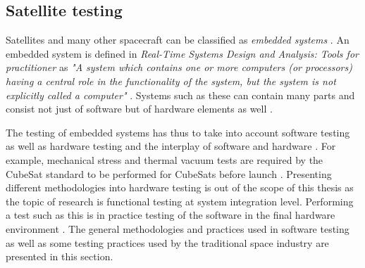 \documentclass[english,12pt,a4paper,pdftex,elec,utf8]{aaltothesis}
\begin{document}
\subsection{Satellite testing}
Satellites and many other spacecraft can be classified as \textit{embedded systems} \cite{embeddedjokusatellite}. An embedded system is defined in \textit{Real-Time Systems Design and Analysis: Tools for practitioner} as \textit{"A system which contains one or more computers (or processors) having a central role in the functionality of the system, but the system is not explicitly called a computer"} \cite{sularikurssi}. Systems such as these can contain  many parts and consist not just of software but of hardware elements as well \cite{embeddedsofteng}.\par
The testing of embedded systems has thus to take into account software testing as well as hardware testing and the interplay of software and hardware \cite{embeddedsofteng}. For example, mechanical stress and thermal vacuum tests are required by the CubeSat standard to be performed for CubeSats before launch \cite{cds}. Presenting different methodologies into hardware testing is out of the scope of this thesis as the topic of research is functional testing at system integration level. Performing a test such as this is in practice testing of the software in the final hardware environment \cite{embeddedsofteng}. The general methodologies and practices used in software testing as well as some testing practices used by the traditional space industry are presented in this section.\par   
\end{document}
